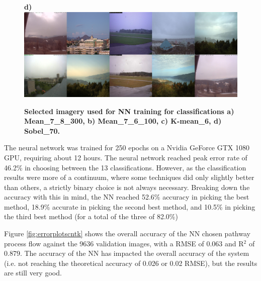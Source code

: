 \documentclass[final,3p,times,authoryear]{elsarticle}
\begin{document}
\begin{figure}
\textbf{d)}\includegraphics[trim = 0mm 0mm 0mm 0mm,clip,scale=0.14]{Images/13-9_Sobel_70_tiles.png}
\caption{\textbf{Selected imagery used for NN training for classifications 
a) Mean\_7\_8\_300, b) Mean\_7\_6\_100, c) K-mean\_6, d) Sobel\_70.}}
\label{fig:classImages}
\end{figure}

The neural network was trained for 250 epochs on a Nvidia GeForce GTX 1080 GPU, requiring about 12 hours. The neural network reached peak error rate of 46.2\% in choosing between the 13 classifications. However, as the classification results were more of a continuum, where some techniques did only slightly better than others, a strictly binary choice is not always necessary. Breaking down the accuracy with this in mind, the NN reached 52.6\% accuracy in picking the best method, 18.9\% accurate in picking the second best method, and 10.5\% in picking the third best method (for a total of the three of 82.0\%)

Figure \ref{fig:errorplotscntk} shows the overall accuracy of the NN chosen pathway process flow against the 9636 validation images, with a RMSE of 0.063 and R$^{2}$ of 0.879. The accuracy of the NN has impacted the overall accuracy of the system (i.e. not reaching the theoretical accuracy of 0.026 or 0.02 RMSE), but the results are still very good. 










\end{document}
